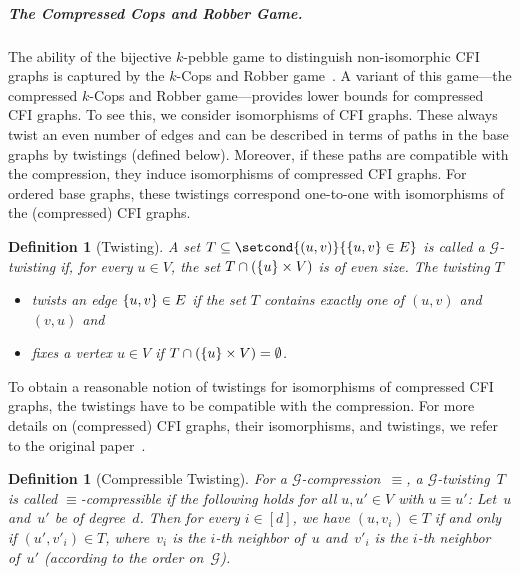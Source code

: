 \documentclass[10pt,a4paper]{article}
\newcommand{\defining}[1]{\emph{#1}}
\DeclarePairedDelimiter\set{\lbrace}{\rbrace}
\newcommand{\comp}{\equiv}
\newcommand{\graphG}{\mathcal{G}}
\newtheorem{definition}[theorem]{Definition}
\begin{document}
\subparagraph*{The Compressed Cops and Robber Game.}

The ability of the bijective $k$-pebble game
to distinguish non-isomorphic CFI graphs
is captured by the $k$-Cops and Robber game~\cite{SeymourThomas93, DBLP:conf/focs/GroheLNS23}.
A variant of this game---the compressed $k$-Cops and Robber game---provides lower bounds for compressed CFI graphs.
To see this, we consider isomorphisms of CFI graphs. These always twist an even number of edges and can be described 
in terms of paths in the base graphs by twistings (defined below). Moreover, if these paths are compatible with the compression, they induce isomorphisms of  compressed CFI graphs.
For ordered base graphs, these twistings correspond one-to-one with isomorphisms of the (compressed) CFI graphs.

\begin{definition}[Twisting]
        A set $T \subseteq \setcond{(u,v)}{\set{u,v} \in E}$
        is called a \defining{$\graphG$-twisting}
        if, for every $u \in V$, the set $T \cap (\set{u} \times V)$
        is of even size.
        The twisting $T$
        \begin{itemize}
                \item \defining{twists} an edge $\set{u,v} \in E$
                if the set $T$
                contains exactly one of $(u,v)$ and $(v,u)$ and
                \item \defining{fixes} a vertex $u \in V$ if $T \cap (\set{u} \times V) = \emptyset$.
        \end{itemize}
%
%
%
\end{definition}

\noindent To obtain a reasonable notion of twistings for isomorphisms of  compressed CFI graphs,
the twistings have to be compatible with the compression.
For more details on (compressed) CFI graphs, their isomorphisms, and twistings,
we refer to the original paper~\cite{DBLP:conf/focs/GroheLNS23}.

\begin{definition}[Compressible Twisting]
        For a $\graphG$-compression~$\comp$,
        a $\graphG$-twisting~$T$ is called \linebreak \defining{$\comp$\nobreakdash-compressible} if the following holds for all $u,u' \in V$ with $u \comp u'$:
        Let~$u$ and~$u'$ be of degree~$d$.
        Then for every $i\in[d]$, we have
        $(u,v_i) \in T$ if and only if $(u',v'_i) \in T$,
        where~$v_i$ is the $i$-th neighbor of~$u$ and~$v'_i$ is the $i$-th neighbor of~$u'$ (according to the order on~$\graphG$).
\end{definition}
\end{document}
